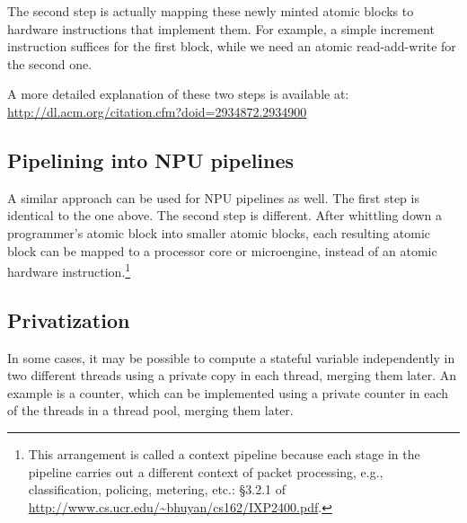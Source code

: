 The second step is actually mapping these newly minted atomic blocks to
hardware instructions that implement them. For example, a simple increment
instruction suffices for the first block, while we need an atomic
read-add-write for the second one.

A more detailed explanation of these two steps is available at:
\url{http://dl.acm.org/citation.cfm?doid=2934872.2934900}

\subsection{Pipelining into NPU pipelines}
A similar approach can be used for NPU pipelines as well. The first step is
identical to the one above. The second step is different. After whittling down
a programmer's atomic block into smaller atomic blocks, each resulting atomic
block can be mapped to a processor core or microengine, instead of an atomic
hardware instruction.\footnote{This arrangement is
called a context pipeline because each stage in the pipeline carries out a
different context of packet processing, e.g., classification, policing,
metering, etc.: \S3.2.1 of
\url{http://www.cs.ucr.edu/~bhuyan/cs162/IXP2400.pdf}.}

\subsection{Privatization}

In some cases, it may be possible to compute a stateful variable independently
in two different threads using a private copy in each thread, merging them
later. An example is a counter, which can be implemented using a private
counter in each of the threads in a thread pool, merging them later.
